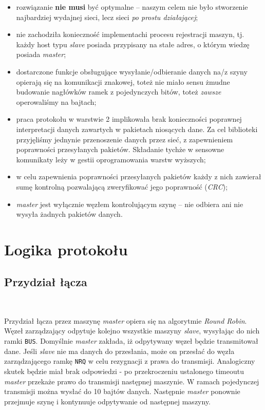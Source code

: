 \documentclass[a4paper,12pt]{article}
\begin{document}
\begin{itemize}
  \item rozwiązanie \textbf{nie musi} być optymalne -- naszym celem nie było
        stworzenie najbardziej wydajnej sieci, lecz sieci \emph{po prostu
        działającej};
  \item nie zachodziła konieczność implementachi procesu rejestracji maszyn,
        tj. każdy host typu \emph{slave} posiada przypisany na stałe adres,
        o którym wiedzę posiada \emph{master};
  \item dostarczone funkcje obsługujące wysyłanie/odbieranie danych na/z
        szyny opierają się na komunikacji znakowej, toteż nie miało sensu
        żmudne budowanie nagłówków ramek z pojedynczych bitów, toteż
        \emph{zawsze} operowaliśmy na bajtach;
  \item praca protokołu w warstwie 2 implikowała brak konieczności poprawnej
        interpretacji danych zawartych w pakietach niosących dane. Za cel
        biblioteki przyjęliśmy jednynie przenoszenie danych przez sieć, z
        zapewnieniem poprawności przesyłanych pakietów. Składanie tychże w
        sensowne komunikaty leży w gestii oprogramowania warstw wyższych;
  \item w celu zapewnienia poprawności przesyłanych pakietów każdy z nich
        zawierał sumę kontrolną pozwalającą zweryfikować jego poprawność
        (\emph{CRC});
  \item \emph{master} jest wyłącznie węzłem kontrolującym szynę -- nie
        odbiera ani nie wysyła żadnych pakietów danych.
\end{itemize}

\section{Logika protokołu}

\subsection{Przydział łącza}\

Przydział łącza przez maszynę \emph{master} opiera się na algorytmie
\emph{Round Robin}. Węzeł zarządzający odpytuje kolejno wszystkie maszyny
\emph{slave}, wysyłając do nich ramki \texttt{BUS}. Domyślnie \emph{master}
zakłada, iż odpytywany węzeł będzie transmitował dane. Jeśli \emph{slave} nie
ma danych do przesłania, może on przesłać do węzła zarządzającego ramkę
\texttt{NRQ} w celu rezygnacji z prawa do transmisji. Analogiczny skutek będzie
miał brak odpowiedzi - po przekroczeniu ustalonego timeoutu \emph{master}
przekaże prawo do transmisji następnej maszynie. W ramach pojedynczej
transmisji można wysłać do 10 bajtów danych. Następnie \emph{master} ponownie
przejmuje szynę i kontynuuje odpytywanie od następnej maszyny.
\end{document}
